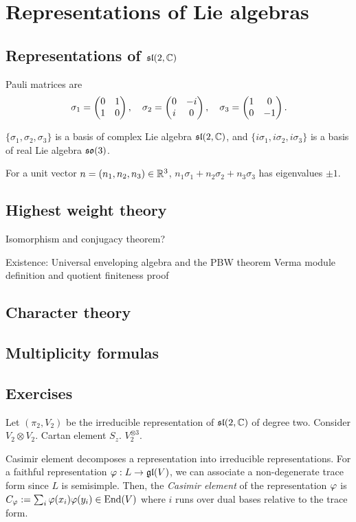 \documentclass{../../large}
\begin{document}
\chapter{Representations of Lie algebras}
\section{Representations of $\mathfrak{sl}(2,\mathbb{C})$}
\begin{prb}
Pauli matrices are
\[\sigma_1=\begin{pmatrix}0&1\\1&0\end{pmatrix},\quad\sigma_2=\begin{pmatrix}0&-i\\i&0\end{pmatrix},\quad\sigma_3=\begin{pmatrix}1&0\\0&-1\end{pmatrix}.\]
\begin{parts}
\item $\{\sigma_1,\sigma_2,\sigma_3\}$ is a basis of complex Lie algebra $\mathfrak{sl}(2,\mathbb{C})$, and $\{i\sigma_1,i\sigma_2,i\sigma_3\}$ is a basis of real Lie algebra $\mathfrak{so}(3)$.
\item For a unit vector $n=(n_1,n_2,n_3)\in\mathbb{R}^3$, $n_1\sigma_1+n_2\sigma_2+n_3\sigma_3$ has eigenvalues $\pm1$.
\end{parts}
\end{prb}
\section{Highest weight theory}

Isomorphism and conjugacy theorem?

Existence:
Universal enveloping algebra and the PBW theorem
Verma module definition and quotient finiteness proof

\section{Character theory}

\section{Multiplicity formulas}

\section*{Exercises}
\begin{prb}
Let $(\pi_2,V_2)$ be the irreducible representation of $\mathfrak{sl}(2,\mathbb{C})$ of degree two.
Consider $V_2\otimes V_2$.
Cartan element $S_z$.
$V_2^{\otimes3}$.
\end{prb}
\begin{prb}
Casimir element decomposes a representation into irreducible representations.
For a faithful representation $\varphi:L\to\mathfrak{gl}(V)$, we can associate a non-degenerate trace form since $L$ is semisimple.
Then, the \emph{Casimir element} of the representation $\varphi$ is $C_\varphi:=\sum_i\varphi(x_i)\varphi(y_i)\in\operatorname{End}(V)$ where $i$ runs over dual bases relative to the trace form.
\end{prb}
\end{document}
